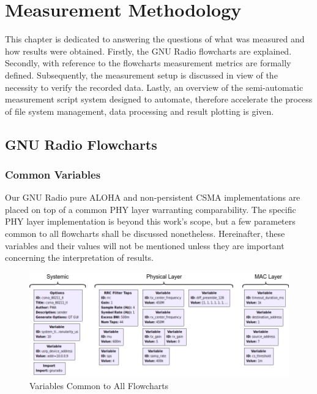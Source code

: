 \chapter{Measurement Methodology}

This chapter is dedicated to answering the questions of what was measured and how results were obtained. Firstly, the GNU Radio flowcharts are explained. Secondly, with reference to the flowcharts measurement metrics are formally defined. Subsequently, the measurement setup is discussed in view of the necessity to verify the recorded data. Lastly, an overview of the semi-automatic measurement script system designed to automate, therefore accelerate the process of file system management, data processing and result plotting is given.

\section{GNU Radio Flowcharts}

\subsection{Common Variables}

Our GNU Radio pure ALOHA and non-persistent CSMA implementations are placed on top of a common PHY layer warranting comparability. The specific PHY layer implementation is beyond this work's scope, but a few parameters common to all flowcharts shall be discussed nonetheless. Hereinafter, these variables and their values will not be mentioned unless they are important concerning the interpretation of results.

\begin{figure}[ht]
	\label{fig:grc-common-variables}
	\begin{center}
		\includegraphics[width=\textwidth]{pictures/grc_common_variables}
	\end{center}
\caption{Variables Common to All Flowcharts}
\end{figure}     

